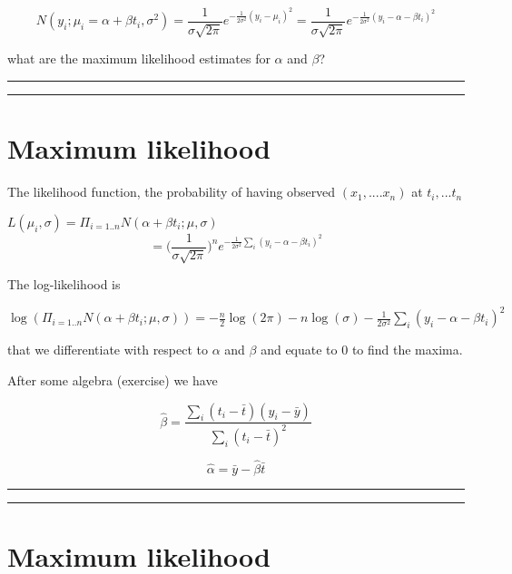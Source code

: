 \documentclass[
]{book}
\begin{document}
\[N(y_i;\mu_i=\alpha+\beta t_i,\sigma^2)= \frac{1}{\sigma \sqrt{2 \pi}} e^{-\frac{1}{2\sigma^2} (y_i-\mu_i)^2}= \frac{1}{\sigma \sqrt{2 \pi}} e^{-\frac{1}{2\sigma^2} (y_i-\alpha-\beta t_i)^2}\]

what are the maximum likelihood estimates for \(\alpha\) and \(\beta\)?

\begin{center}\rule{0.5\linewidth}{0.5pt}\end{center}

\begin{center}\rule{0.5\linewidth}{0.5pt}\end{center}

\hypertarget{maximum-likelihood-4}{%
\section{Maximum likelihood}\label{maximum-likelihood-4}}

The likelihood function, the probability of having observed \((x_1, ....x_n)\) at \(t_i, ...t_n\)

\(L(\mu_i, \sigma)=\Pi_{i=1..n} N(\alpha+\beta t_i;\mu,\sigma)\)
\[=\big( \frac{1}{\sigma \sqrt{2 \pi}}\big)^n e^{-\frac{1}{2\sigma^2} \sum_i(y_i-\alpha-\beta t_i)^2}\]

The log-likelihood is

\(\log(\Pi_{i=1..n} N(\alpha+\beta t_i;\mu,\sigma))=-\frac{n}{2}\log(2\pi)-n\log( \sigma) - \frac{1}{2\sigma^2} \sum_i(y_i-\alpha-\beta t_i)^2\)

that we differentiate with respect to \(\alpha\) and \(\beta\) and equate to 0 to find the maxima.

After some algebra (exercise) we have

\[\hat{\beta}=\frac{\sum_i (t_i-\bar{t})(y_i -\bar{y})}{\sum_i (t_i-\bar{t})^2}\]

\[\hat{\alpha} = \bar{y} - \hat{\beta} \bar{t}\]

\begin{center}\rule{0.5\linewidth}{0.5pt}\end{center}

\begin{center}\rule{0.5\linewidth}{0.5pt}\end{center}

\hypertarget{maximum-likelihood-5}{%
\section{Maximum likelihood}\label{maximum-likelihood-5}}
\end{document}
